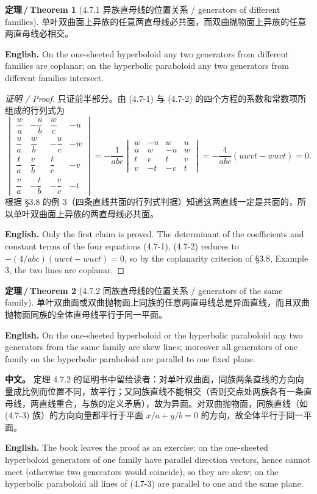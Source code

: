\documentclass[UTF8,11pt,a4paper]{ctexart}
\newcommand{\APS}[2]{\par\noindent\textbf{中文。} #1\par\noindent\textbf{English.} #2\par\smallskip}
\newcommand{\EN}[1]{\par\noindent \textbf{English.} #1\par}
\theoremstyle{definition}
\newtheorem*{theorem}{定理\,/\,Theorem}
\begin{document}
\begin{theorem}[4.7.1 异族直母线的位置关系 / generators of different families]\label{thm:gens-cross}
单叶双曲面上异族的任意两直母线必共面，而双曲抛物面上异族的任意两直母线必相交。
\EN{On the one-sheeted hyperboloid any two generators from different families are coplanar; on the hyperbolic paraboloid any two generators from different families intersect.}
\end{theorem}

\begin{proof}[证明 / Proof]
只证前半部分。由 (4.7-1) 与 (4.7-2) 的四个方程的系数和常数项所组成的行列式为
\[
\begin{vmatrix}
\dfrac{w}{a} & -\dfrac{u}{b} & \dfrac{w}{c} & -u\\[6pt]
\dfrac{u}{a} & \dfrac{w}{b} & -\dfrac{u}{c} & -w\\[6pt]
\dfrac{t}{a} & \dfrac{v}{b} & \dfrac{t}{c} & -v\\[6pt]
\dfrac{v}{a} & -\dfrac{t}{b} & -\dfrac{v}{c} & -t
\end{vmatrix}
=-\frac{1}{abc}
\begin{vmatrix}
w & -u & w & u\\
u & w & -u & w\\
t & v & t & v\\
v & -t & -v & t
\end{vmatrix}
=-\frac{4}{abc}(uwvt-wuvt)=0.
\]
根据 §3.8 的例 3（四条直线共面的行列式判据）知道这两直线一定是共面的，所以单叶双曲面上异族的两直母线必共面。
\EN{Only the first claim is proved. The determinant of the coefficients and constant terms of the four equations (4.7-1), (4.7-2) reduces to $-(4/abc)(uwvt-wuvt)=0$, so by the coplanarity criterion of §3.8, Example 3, the two lines are coplanar.}
\end{proof}

\begin{theorem}[4.7.2 同族直母线的位置关系 / generators of the same family]\label{thm:gens-skew}
单叶双曲面或双曲抛物面上同族的任意两直母线总是异面直线，而且双曲抛物面同族的全体直母线平行于同一平面。
\EN{On the one-sheeted hyperboloid or the hyperbolic paraboloid any two generators from the same family are skew lines; moreover all generators of one family on the hyperbolic paraboloid are parallel to one fixed plane.}
\end{theorem}

\APS{定理 4.7.2 的证明书中留给读者：对单叶双曲面，同族两条直线的方向向量成比例而位置不同，故平行；又同族直线不能相交（否则交点处两族各有一条直母线，两直线重合，与族的定义矛盾），故为异面。对双曲抛物面，同族直线（如 (4.7-3) 族）的方向向量都平行于平面 $x/a+y/b=0$ 的方向，故全体平行于同一平面。}{The book leaves the proof as an exercise: on the one-sheeted hyperboloid generators of one family have parallel direction vectors, hence cannot meet (otherwise two generators would coincide), so they are skew; on the hyperbolic paraboloid all lines of (4.7-3) are parallel to one and the same plane.}
\end{document}
